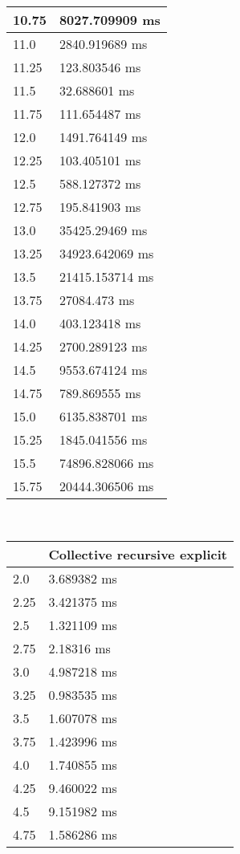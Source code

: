 \begin{multicols}{2}
\begin{tabular}{|l|l|}
		10.75 & 8027.709909 ms \\ \hline
		11.0 & 2840.919689 ms \\ \hline
		11.25 & 123.803546 ms \\ \hline
		11.5 & 32.688601 ms \\ \hline
		11.75 & 111.654487 ms \\ \hline
		12.0 & 1491.764149 ms \\ \hline
		12.25 & 103.405101 ms \\ \hline
		12.5 & 588.127372 ms \\ \hline
		12.75 & 195.841903 ms \\ \hline
		13.0 & 35425.29469 ms \\ \hline
		13.25 & 34923.642069 ms \\ \hline
		13.5 & 21415.153714 ms \\ \hline
		13.75 & 27084.473 ms \\ \hline
		14.0 & 403.123418 ms \\ \hline
		14.25 & 2700.289123 ms \\ \hline
		14.5 & 9553.674124 ms \\ \hline
		14.75 & 789.869555 ms \\ \hline
		15.0 & 6135.838701 ms \\ \hline
		15.25 & 1845.041556 ms \\ \hline
		15.5 & 74896.828066 ms \\ \hline
		15.75 & 20444.306506 ms \\ \hline
	\end{tabular}\\
	\begin{tabular}{|l|l|}
		\hline
		& Collective recursive explicit \\ \hline
		2.0 & 3.689382 ms \\ \hline
		2.25 & 3.421375 ms \\ \hline
		2.5 & 1.321109 ms \\ \hline
		2.75 & 2.18316 ms \\ \hline
		3.0 & 4.987218 ms \\ \hline
		3.25 & 0.983535 ms \\ \hline
		3.5 & 1.607078 ms \\ \hline
		3.75 & 1.423996 ms \\ \hline
		4.0 & 1.740855 ms \\ \hline
		4.25 & 9.460022 ms \\ \hline
		4.5 & 9.151982 ms \\ \hline
		4.75 & 1.586286 ms \\ \hline

\end{tabular}
\end{multicols}
